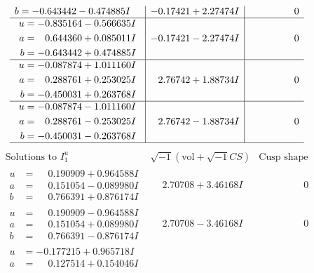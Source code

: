 \documentclass[1p]{elsarticle_modified}
\theoremstyle{definition}
\newcommand{\I}{\sqrt{-1}}
\begin{document}
$$\begin{array}{c|c|c}
\begin{aligned}
b &= -0.643442 - 0.474885 I\end{aligned}
 & -0.17421 + 2.27474 I & \phantom{-0.000000 } 0 \\ \hline\begin{aligned}
u &= -0.835164 - 0.566635 I \\
a &= \phantom{-}0.644360 + 0.085011 I \\
b &= -0.643442 + 0.474885 I\end{aligned}
 & -0.17421 - 2.27474 I & \phantom{-0.000000 } 0 \\ \hline\begin{aligned}
u &= -0.087874 + 1.011160 I \\
a &= \phantom{-}0.288761 + 0.253025 I \\
b &= -0.450031 + 0.263768 I\end{aligned}
 & \phantom{-}2.76742 + 1.88734 I & \phantom{-0.000000 } 0 \\ \hline\begin{aligned}
u &= -0.087874 - 1.011160 I \\
a &= \phantom{-}0.288761 - 0.253025 I \\
b &= -0.450031 - 0.263768 I\end{aligned}
 & \phantom{-}2.76742 - 1.88734 I & \phantom{-0.000000 } 0\\
 \hline 
 \end{array}$$\newpage$$\begin{array}{c|c|c}  
\text{Solutions to }I^u_{1}& \I (\text{vol} + \sqrt{-1}CS) & \text{Cusp shape}\\
 \hline 
\begin{aligned}
u &= \phantom{-}0.190909 + 0.964588 I \\
a &= \phantom{-}0.151054 - 0.089980 I \\
b &= \phantom{-}0.766391 + 0.876174 I\end{aligned}
 & \phantom{-}2.70708 + 3.46168 I & \phantom{-0.000000 } 0 \\ \hline\begin{aligned}
u &= \phantom{-}0.190909 - 0.964588 I \\
a &= \phantom{-}0.151054 + 0.089980 I \\
b &= \phantom{-}0.766391 - 0.876174 I\end{aligned}
 & \phantom{-}2.70708 - 3.46168 I & \phantom{-0.000000 } 0 \\ \hline\begin{aligned}
u &= -0.177215 + 0.965718 I \\
a &= \phantom{-}0.127514 + 0.154046 I \\

\end{aligned}
\end{array}$$
\end{document}
